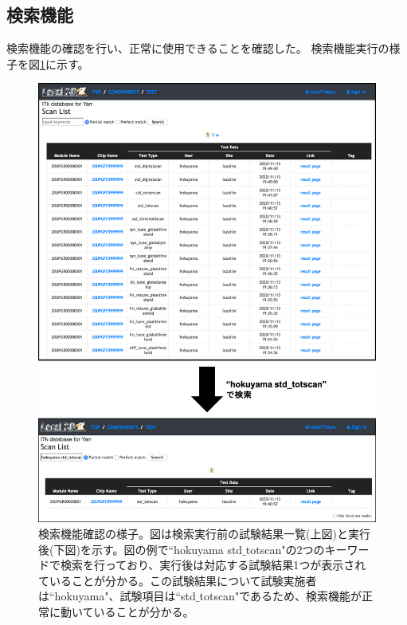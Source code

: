 \clearpage
\subsection{検索機能}

検索機能の確認を行い、正常に使用できることを確認した。
検索機能実行の様子を図\ref{demo_search_function}に示す。

\begin{figure}[bpt]\centering
\includegraphics[width=13cm]{./demo_search_function.png}
\caption[検索機能確認の様子]{検索機能確認の様子。図は検索実行前の試験結果一覧(上図)と実行後(下図)を示す。図の例で``hokuyama std$\_$totscan"の2つのキーワードで検索を行っており、実行後は対応する試験結果1つが表示されていることが分かる。この試験結果について試験実施者は``hokuyama"、試験項目は``std$\_$totscan"であるため、検索機能が正常に動いていることが分かる。}
\label{demo_search_function}
\end{figure}

